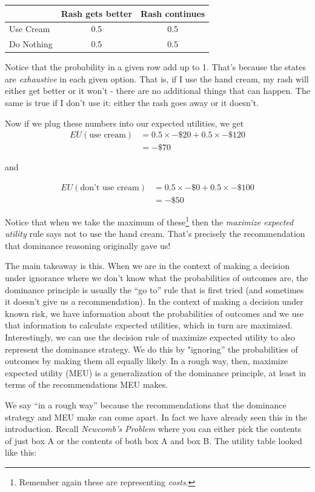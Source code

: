 \documentclass[]{tufte-book}
\begin{document}
\begin{longtable}[]{@{}lcc@{}}
\toprule
& Rash gets better & Rash continues\tabularnewline
\midrule
\endhead
Use Cream & 0.5 & 0.5\tabularnewline
Do Nothing & 0.5 & 0.5\tabularnewline
\bottomrule
\end{longtable}

Notice that the probability in a given row add up to 1. That's because the states are \emph{exhaustive} in each given option. That is, if I use the hand cream, my rash will either get better or it won't - there are no additional things that can happen. The same is true if I don't use it: either the rash goes away or it doesn't.

Now if we plug these numbers into our expected utilities, we get
\[
  \begin{aligned}
  EU(\text{use cream}) &= 0.5\times -\$20 + 0.5\times -\$120\\
  &= -\$70
  \end{aligned}
\]

and

\[
  \begin{aligned}
EU(\text{don't use cream}) &= 0.5\times -\$0 + 0.5\times -\$100 \\ 
  &= -\$50
  \end{aligned}
\]

Notice that when we take the maximum of these\footnote{Remember again these are representing \emph{costs}.} then the \emph{maximize expected utility} rule says not to use the hand cream. That's precisely the recommendation that dominance reasoning originally gave us!

The main takeaway is this. When we are in the context of making a decision under ignorance where we don't know what the probabilities of outcomes are, the dominance principle is usually the ``go to'' rule that is first tried (and sometimes it doesn't give us a recommendation). In the context of making a decision under known risk, we have information about the probabilities of outcomes and we use that information to calculate expected utilities, which in turn are maximized. Interestingly, we can use the decision rule of maximize expected utility to also represent the dominance strategy. We do this by "ignoring'' the probabilities of outcomes by making them all equally likely. In a rough way, then, maximize expected utility (MEU) is a generalization of the dominance principle, at least in terms of the recommendations MEU makes.

We say ``in a rough way'' because the recommendations that the dominance strategy and MEU make can come apart. In fact we have already seen this in the introduction. Recall \emph{Newcomb's Problem} where you can either pick the contents of just box A or the contents of both box A and box B. The utility table looked like this:
\end{document}
